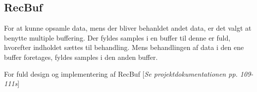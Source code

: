 \subsection{RecBuf}
For at kunne opsamle data, mens der bliver behanldet andet data, er det valgt at benytte multiple buffering. Der fyldes samples i en buffer til denne er fuld, hvorefter indholdet sættes til behandling. Mens behandlingen af data i den ene buffer foretages, fyldes samples i den anden buffer.

For fuld design og implementering af RecBuf [\textit{Se projektdokumentationen pp. 109-111s}]
